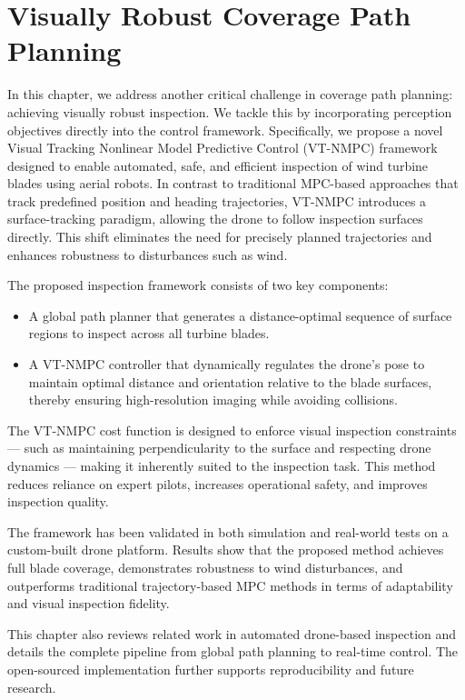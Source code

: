 \chapter{Visually Robust Coverage Path Planning}
In this chapter, we address another critical challenge in coverage path planning: achieving visually robust inspection. We tackle this by incorporating perception objectives directly into the control framework. Specifically, we propose a novel Visual Tracking Nonlinear Model Predictive Control (VT-NMPC) framework designed to enable automated, safe, and efficient inspection of wind turbine blades using aerial robots. In contrast to traditional MPC-based approaches that track predefined position and heading trajectories, VT-NMPC introduces a surface-tracking paradigm, allowing the drone to follow inspection surfaces directly. This shift eliminates the need for precisely planned trajectories and enhances robustness to disturbances such as wind.

The proposed inspection framework consists of two key components:
\begin{itemize}
    
\item A global path planner that generates a distance-optimal sequence of surface regions to inspect across all turbine blades.

\item  A VT-NMPC controller that dynamically regulates the drone’s pose to maintain optimal distance and orientation relative to the blade surfaces, thereby ensuring high-resolution imaging while avoiding collisions.

\end{itemize}

The VT-NMPC cost function is designed to enforce visual inspection constraints — such as maintaining perpendicularity to the surface and respecting drone dynamics — making it inherently suited to the inspection task. This method reduces reliance on expert pilots, increases operational safety, and improves inspection quality.

The framework has been validated in both simulation and real-world tests on a custom-built drone platform. Results show that the proposed method achieves full blade coverage, demonstrates robustness to wind disturbances, and outperforms traditional trajectory-based MPC methods in terms of adaptability and visual inspection fidelity.

This chapter also reviews related work in automated drone-based inspection and details the complete pipeline from global path planning to real-time control. The open-sourced implementation further supports reproducibility and future research.